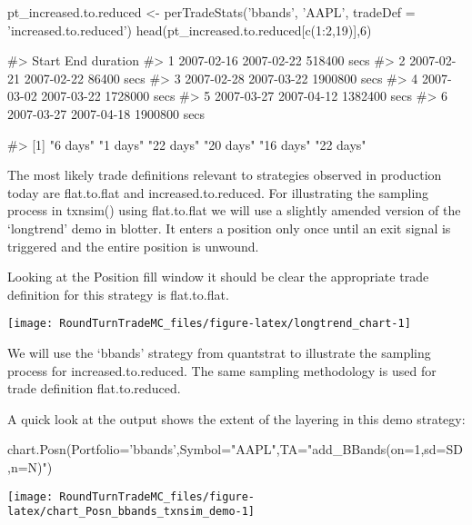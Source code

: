 \begin{Schunk}
\begin{Sinput}
pt_increased.to.reduced <- perTradeStats('bbands', 'AAPL', tradeDef = 'increased.to.reduced')
head(pt_increased.to.reduced[c(1:2,19)],6)
\end{Sinput}
\begin{Soutput}
#>        Start        End     duration
#> 1 2007-02-16 2007-02-22  518400 secs
#> 2 2007-02-21 2007-02-22   86400 secs
#> 3 2007-02-28 2007-03-22 1900800 secs
#> 4 2007-03-02 2007-03-22 1728000 secs
#> 5 2007-03-27 2007-04-12 1382400 secs
#> 6 2007-03-27 2007-04-18 1900800 secs
\end{Soutput}
\begin{Soutput}
#> [1] "6 days"  "1 days"  "22 days" "20 days" "16 days" "22 days"
\end{Soutput}
\end{Schunk}

The most likely trade definitions relevant to strategies observed in
production today are flat.to.flat and increased.to.reduced. For
illustrating the sampling process in txnsim() using flat.to.flat we will
use a slightly amended version of the `longtrend' demo in blotter. It
enters a position only once until an exit signal is triggered and the
entire position is unwound.

Looking at the Position fill window it should be clear the appropriate
trade definition for this strategy is flat.to.flat.

\begin{Schunk}


\begin{center}\texttt{[image: RoundTurnTradeMC\_files/figure-latex/longtrend\_chart-1]} \end{center}

\end{Schunk}

We will use the `bbands' strategy from quantstrat to illustrate the
sampling process for increased.to.reduced. The same sampling methodology
is used for trade definition flat.to.reduced.

A quick look at the output shows the extent of the layering in this demo
strategy:

\begin{Schunk}
\begin{Sinput}
chart.Posn(Portfolio='bbands',Symbol="AAPL",TA="add_BBands(on=1,sd=SD,n=N)")
\end{Sinput}


\begin{center}\texttt{[image: RoundTurnTradeMC\_files/figure-latex/chart\_Posn\_bbands\_txnsim\_demo-1]} \end{center}

\end{Schunk}

